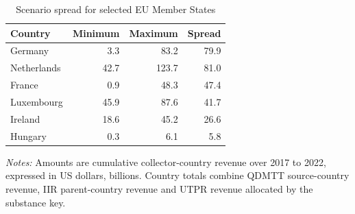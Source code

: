 \begin{table}[H]
\centering
\small
\caption[Scenario spread for selected EU Member States]{Scenario spread for selected EU Member States}
\label{tab:country_spread_updated}
\begin{tabular}{@{}lrrr@{}}
\toprule
Country & Minimum & Maximum & Spread \\
\midrule
Germany &  3.3 &  83.2 & 79.9 \\
Netherlands & 42.7 & 123.7 & 81.0 \\
France &  0.9 &  48.3 & 47.4 \\
Luxembourg & 45.9 &  87.6 & 41.7 \\
Ireland & 18.6 &  45.2 & 26.6 \\
Hungary &  0.3 &   6.1 &  5.8 \\
\bottomrule
\end{tabular}

\vspace{0.5em}
\begin{minipage}{0.96\textwidth}
\footnotesize\raggedright \textit{Notes:} Amounts are cumulative collector-country revenue over 2017 to 2022, expressed in US dollars, billions. Country totals combine QDMTT source-country revenue, IIR parent-country revenue and UTPR revenue allocated by the substance key.
\end{minipage}
\end{table}
